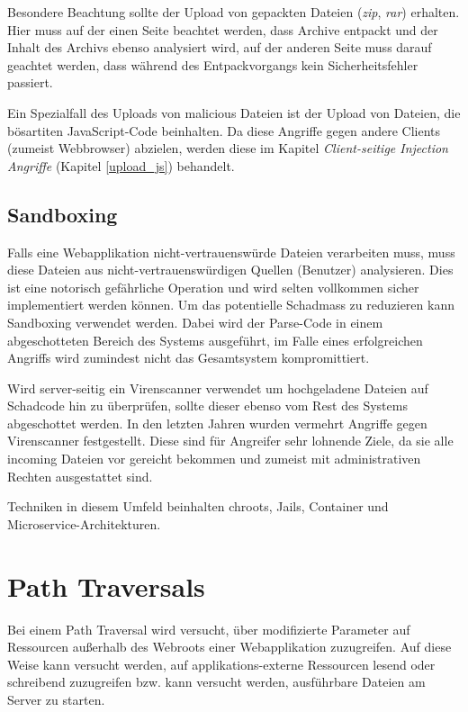 Besondere Beachtung sollte der Upload von gepackten Dateien (\textit{zip}, \textit{rar}) erhalten. Hier muss auf der einen Seite beachtet werden, dass Archive entpackt und der Inhalt des Archivs ebenso analysiert wird, auf der anderen Seite muss darauf geachtet werden, dass während des Entpackvorgangs kein Sicherheitsfehler passiert.

Ein Spezialfall des Uploads von malicious Dateien ist der Upload von Dateien, die bösartiten JavaScript-Code beinhalten. Da diese Angriffe gegen andere Clients (zumeist Webbrowser) abzielen, werden diese im Kapitel \textit{Client-seitige Injection Angriffe} (Kapitel \ref{upload_js}) behandelt.

\subsection{Sandboxing}

Falls eine Webapplikation nicht-vertrauenswürde Dateien verarbeiten muss, muss diese Dateien aus nicht-vertrauenswürdigen Quellen (Benutzer) analysieren. Dies ist eine notorisch gefährliche Operation und wird selten vollkommen sicher implementiert werden können. Um das potentielle Schadmass zu reduzieren kann Sandboxing verwendet werden. Dabei wird der Parse-Code in einem abgeschotteten Bereich des Systems ausgeführt, im Falle eines erfolgreichen Angriffs wird zumindest nicht das Gesamtsystem kompromittiert.

Wird server-seitig ein Virenscanner verwendet um hochgeladene Dateien auf Schadcode hin zu überprüfen, sollte dieser ebenso vom Rest des Systems abgeschottet werden. In den letzten Jahren wurden vermehrt Angriffe gegen Virenscanner festgestellt. Diese sind für Angreifer sehr lohnende Ziele, da sie alle incoming Dateien vor gereicht bekommen und zumeist mit administrativen Rechten ausgestattet sind.

Techniken in diesem Umfeld beinhalten chroots, Jails, Container und Microservice-Architekturen.

\section{Path Traversals}

Bei einem Path Traversal wird versucht, über modifizierte Parameter auf Ressourcen außerhalb des Webroots einer Webapplikation zuzugreifen. Auf diese Weise kann versucht werden, auf applikations-externe Ressourcen lesend oder schreibend zuzugreifen bzw. kann versucht werden, ausführbare Dateien am Server zu starten.

